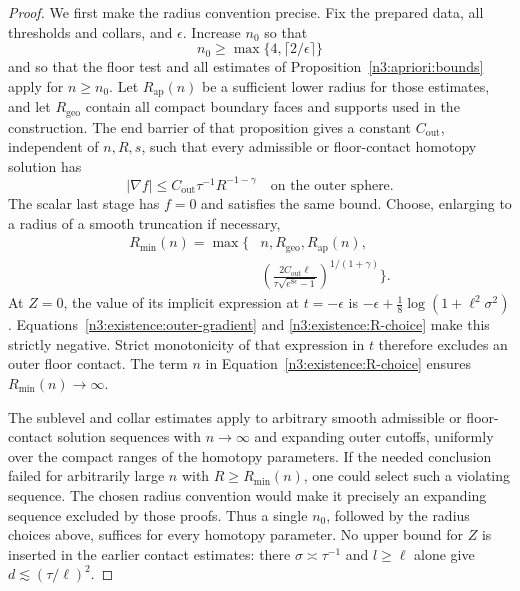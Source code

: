 \begin{proof}
We first make the radius convention precise.  Fix the prepared
data, all thresholds and collars, and $\epsilon$.  Increase $n_0$
so that
\begin{equation}\label{n3:existence:n-choice}
 n_0\ge\max\{4,\lceil2/\epsilon\rceil\}
\end{equation}
and so that the floor test and all estimates of
Proposition~\ref{n3:apriori:bounds} apply for $n\ge n_0$.
Let $R_{\mathrm{ap}}(n)$ be a sufficient lower radius for those
estimates, and let $R_{\mathrm{geo}}$ contain all compact boundary
faces and supports used in the construction.  The end barrier of
that proposition gives a constant $C_{\mathrm{out}}$, independent
of $n,R,s$, such that every admissible or floor-contact homotopy
solution has
\begin{equation}\label{n3:existence:outer-gradient}
 |\nabla f|\le
       C_{\mathrm{out}}\tau^{-1}R^{-1-\gamma}
       \quad\text{on the outer sphere}.
\end{equation}
The scalar last stage has $f=0$ and satisfies the same bound.
Choose, enlarging to a radius of a smooth truncation if necessary,
\begin{equation}\label{n3:existence:R-choice}
 \begin{split}
 R_{\min}(n)=\max\biggl\{&n,R_{\mathrm{geo}},R_{\mathrm{ap}}(n),\\
 &\left(\frac{2C_{\mathrm{out}}\ell}
               {\tau\sqrt{e^{8\epsilon}-1}}
        \right)^{1/(1+\gamma)}\biggr\}.
 \end{split}
\end{equation}
At $Z=0$, the value of its implicit expression at $t=-\epsilon$
is $-\epsilon+\frac18\log(1+\ell^2\sigma^2)$.
Equations~\eqref{n3:existence:outer-gradient} and
\eqref{n3:existence:R-choice} make this strictly negative.  Strict
monotonicity of that expression in $t$ therefore excludes an outer
floor contact.  The term $n$ in Equation~\eqref{n3:existence:R-choice}
ensures $R_{\min}(n)\to\infty$.

The sublevel and collar estimates apply to arbitrary smooth
admissible or floor-contact solution sequences with $n\to\infty$
and expanding outer cutoffs, uniformly over the compact ranges of
the homotopy parameters.  If the needed conclusion failed for
arbitrarily large $n$ with $R\ge R_{\min}(n)$, one could select
such a violating sequence.  The chosen radius convention would
make it precisely an expanding sequence excluded by those proofs.
Thus a single $n_0$, followed by the radius choices above, suffices
for every homotopy parameter.  No upper bound for $Z$ is inserted
in the earlier contact estimates: there $\sigma\asymp\tau^{-1}$
and $l\ge\ell$ alone give $d\lesssim(\tau/\ell)^2$.


\end{proof}
